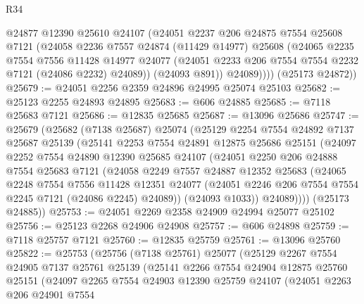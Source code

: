 \begin{lexlean}{R34}
\begin{coremodule}
            @24877
            @12390
            @25610
            @24107
            (@24051
              @2237
              @206
              @24875
              @7554
              @25608
              @7121
              (@24058
                @2236
                @7557
                @24874
                (@11429 @14977)
                @25608
                (@24065
                  @2235
                  @7554
                  @7556
                  @11428
                  @14977
                  @24077
                  (@24051 @2233 @206 @7554 @7554 @2232 @7121 (@24086 @2232) @24089))
                (@24093 @891))
              @24089))))
      (@25173 @24872))
@25679 := @24051 @2256 @2359 @24896 @24995 @25074 @25103
@25682 := @25123 @2255 @24893 @24895
@25683 := @606 @24885
@25685 := @7118 @25683 @7121
@25686 := @12835 @25685
@25687 := @13096 @25686
@25747 := @25679
    (@25682
      (@7138 @25687)
      @25074
      (@25129
        @2254
        @7554
        @24892
        @7137
        @25687
        @25139
        (@25141
          @2253
          @7554
          @24891
          @12875
          @25686
          @25151
          (@24097
            @2252
            @7554
            @24890
            @12390
            @25685
            @24107
            (@24051
              @2250
              @206
              @24888
              @7554
              @25683
              @7121
              (@24058
                @2249
                @7557
                @24887
                @12352
                @25683
                (@24065
                  @2248
                  @7554
                  @7556
                  @11428
                  @12351
                  @24077
                  (@24051 @2246 @206 @7554 @7554 @2245 @7121 (@24086 @2245) @24089))
                (@24093 @1033))
              @24089))))
      (@25173 @24885))
@25753 := @24051 @2269 @2358 @24909 @24994 @25077 @25102
@25756 := @25123 @2268 @24906 @24908
@25757 := @606 @24898
@25759 := @7118 @25757 @7121
@25760 := @12835 @25759
@25761 := @13096 @25760
@25822 := @25753
    (@25756
      (@7138 @25761)
      @25077
      (@25129
        @2267
        @7554
        @24905
        @7137
        @25761
        @25139
        (@25141
          @2266
          @7554
          @24904
          @12875
          @25760
          @25151
          (@24097
            @2265
            @7554
            @24903
            @12390
            @25759
            @24107
            (@24051
              @2263
              @206
              @24901
              @7554

\end{coremodule}
\end{lexlean}
